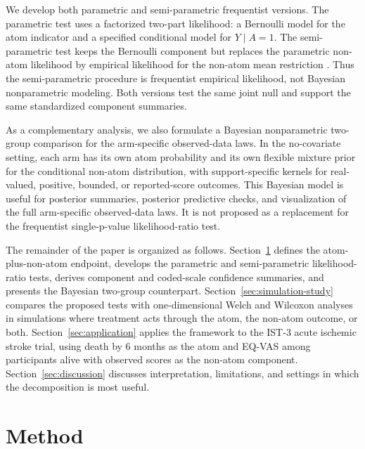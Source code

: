 \documentclass[11pt]{article}
\begin{document}
We develop both parametric and semi-parametric frequentist versions. The parametric test uses a factorized two-part likelihood: a Bernoulli model for the atom indicator and a specified conditional model for $Y\mid A=1$. The semi-parametric test keeps the Bernoulli component but replaces the parametric non-atom likelihood by empirical likelihood for the non-atom mean restriction \citep{owen1988empirical,owen1991empirical,kitamura2001asymptotic}. Thus the semi-parametric procedure is frequentist empirical likelihood, not Bayesian nonparametric modeling. Both versions test the same joint null and support the same standardized component summaries.

As a complementary analysis, we also formulate a Bayesian nonparametric two-group comparison for the arm-specific observed-data laws. In the no-covariate setting, each arm has its own atom probability and its own flexible mixture prior for the conditional non-atom distribution, with support-specific kernels for real-valued, positive, bounded, or reported-score outcomes. This Bayesian model is useful for posterior summaries, posterior predictive checks, and visualization of the full arm-specific observed-data laws. It is not proposed as a replacement for the frequentist single-p-value likelihood-ratio test.

The remainder of the paper is organized as follows. Section~\ref{sec:method} defines the atom-plus-non-atom endpoint, develops the parametric and semi-parametric likelihood-ratio tests, derives component and coded-scale confidence summaries, and presents the Bayesian two-group counterpart. Section~\ref{sec:simulation-study} compares the proposed tests with one-dimensional Welch and Wilcoxon analyses in simulations where treatment acts through the atom, the non-atom outcome, or both. Section~\ref{sec:application} applies the framework to the IST-3 acute ischemic stroke trial, using death by 6 months as the atom and EQ-VAS among participants alive with observed scores as the non-atom component. Section~\ref{sec:discussion} discusses interpretation, limitations, and settings in which the decomposition is most useful.

\section{Method}\label{sec:method}
\end{document}
